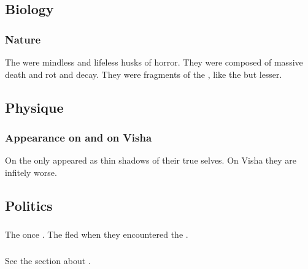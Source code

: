 \subsection{Biology}





\subsubsection{Nature}
The \moongods were mindless and lifeless husks of horror.
They were composed of massive death and rot and decay.
They were fragments of the , like the  but lesser. 









\subsection{Physique}





\subsubsection{Appearance on \Miith and on Visha}
On \Miith the \moongods only appeared as thin shadows of their true selves.
On Visha they are infitely worse.









\subsection{Politics}





\subsubsection{\Caisith}
The \caisith once .
The \caisith fled when they encountered the \moongods. 





\subsubsection{\Umbrae}
See the section about . 









